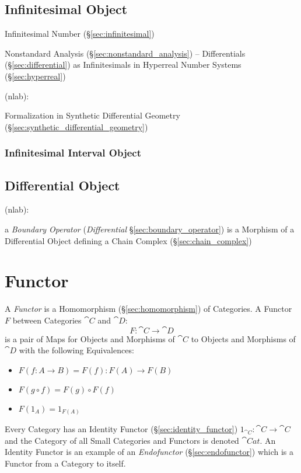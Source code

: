 \subsection{Infinitesimal Object}\label{sec:infinitesimal_object}

\fist Infinitesimal Number (\S\ref{sec:infinitesimal})

\fist Nonstandard Analysis (\S\ref{sec:nonstandard_analysis}) -- Differentials
(\S\ref{sec:differential}) as Infinitesimals in
Hyperreal Number Systems (\S\ref{sec:hyperreal})

(nlab):

Formalization in Synthetic Differential Geometry
(\S\ref{sec:synthetic_differential_geometry})



\subsubsection{Infinitesimal Interval Object}
\label{sec:infinitesimal_interval_object}



\subsection{Differential Object}\label{sec:differential_object}

(nlab):

\fist a \emph{Boundary Operator} (\emph{Differential}
\S\ref{sec:boundary_operator}) is a Morphism of a Differential Object defining a
Chain Complex (\S\ref{sec:chain_complex})



\section{Functor}\label{sec:functor}

A \emph{Functor} is a Homomorphism (\S\ref{sec:homomorphism}) of
Categories. A Functor $F$ between Categories $\cat{C}$ and $\cat{D}$:
\[
  F : \cat{C} \rightarrow \cat{D}
\]
is a pair of Maps for Objects and Morphisms of $\cat{C}$ to Objects
and Morphisms of $\cat{D}$ with the following Equivalences:
\begin{itemize}
\item $F(f : A \rightarrow B) = F(f) : F(A) \rightarrow F(B)$
\item $F(g \circ f) = F(g) \circ F(f)$
\item $F(1_A) = 1_{F(A)}$
\end{itemize}
Every Category has an Identity Functor (\S\ref{sec:identity_functor})
$1_{\cat{C}} : \cat{C} \rightarrow \cat{C}$ and the Category
of all Small Categories and Functors is denoted $\cat{Cat}$. An
Identity Functor is an example of an \emph{Endofunctor}
(\S\ref{sec:endofunctor}) which is a Functor from a Category to
itself.

